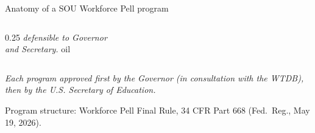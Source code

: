 \documentclass[aspectratio=169,11pt]{beamer}
\newcommand{\monoLabel}[1]{%
  {\ttfamily\fontsize{7.5pt}{9pt}\selectfont\color{textMuted}#1}%
}
\newcommand{\theEyebrowText}{}
\newcommand{\frametitleEyebrow}[1]{\renewcommand{\theEyebrowText}{#1}}
\begin{document}
\begin{frame}{Anatomy of a SOU Workforce Pell program}
\begin{columns}[T,onlytextwidth,totalwidth=\textwidth]
\begin{column}{0.25\textwidth}
{        {\itshape\color{textMuted}defensible to Governor\\
         and Secretary.}%
      }{oil}
    \end{column}
  \end{columns}
  \vspace{8pt}\par
  \centering
  {\itshape\color{textSecondary}\fontsize{10pt}{13pt}\selectfont
   Each program approved first by the Governor (in consultation
   with the WTDB), then by the U.S. Secretary of Education.}\par
  \vspace{4pt}
  \monoLabel{Program structure: Workforce Pell Final Rule, 34 CFR Part 668 (Fed.\ Reg., May 19, 2026).}
\end{frame}

\frametitleEyebrow{Numbers / aligned to existing SOU capacity}
\end{document}

